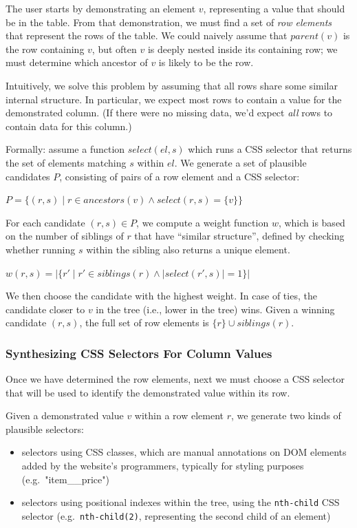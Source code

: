 \documentclass[conference]{IEEEtran}
\providecommand{\tightlist}{%
  \setlength{\itemsep}{0pt}\setlength{\parskip}{0pt}}
\begin{document}
The user starts by demonstrating an element \(v\), representing a value
that should be in the table. From that demonstration, we must find a set
of \emph{row elements} that represent the rows of the table. We could
naively assume that \(parent(v)\) is the row containing \(v\), but often
\(v\) is deeply nested inside its containing row; we must determine
which ancestor of \(v\) is likely to be the row.

Intuitively, we solve this problem by assuming that all rows share some
similar internal structure. In particular, we expect most rows to
contain a value for the demonstrated column. (If there were no missing
data, we'd expect \emph{all} rows to contain data for this column.)

Formally: assume a function \(select(el, s)\) which runs a CSS selector
that returns the set of elements matching \(s\) within \(el\). We
generate a set of plausible candidates \(P\), consisting of pairs of a
row element and a CSS selector:

\(P = \{ (r, s) \mid r \in ancestors(v) \land select(r, s) = \{v\} \}\)

For each candidate \((r, s) \in P\), we compute a weight function \(w\),
which is based on the number of siblings of \(r\) that have ``similar
structure'', defined by checking whether running \(s\) within the
sibling also returns a unique element.

\(w(r, s) = |\{ r' \mid r' \in siblings(r) \land |select(r', s) | = 1 \}|\)

We then choose the candidate with the highest weight. In case of ties,
the candidate closer to \(v\) in the tree (i.e., lower in the tree)
wins. Given a winning candidate \((r, s)\), the full set of row elements
is \(\{r\} \cup siblings(r)\).

\hypertarget{synthesizing-css-selectors-for-column-values}{%
\subsubsection{Synthesizing CSS Selectors For Column
Values}\label{synthesizing-css-selectors-for-column-values}}

Once we have determined the row elements, next we must choose a CSS
selector that will be used to identify the demonstrated value within its
row.

Given a demonstrated value \(v\) within a row element \(r\), we generate
two kinds of plausible selectors:

\begin{itemize}
\tightlist
\item
  selectors using CSS classes, which are manual annotations on DOM
  elements added by the website's programmers, typically for styling
  purposes (e.g.~"item\_\_price")
\item
  selectors using positional indexes within the tree, using the
  \texttt{nth-child} CSS selector (e.g.~\texttt{nth-child(2)},
  representing the second child of an element)
\end{itemize}
\end{document}
